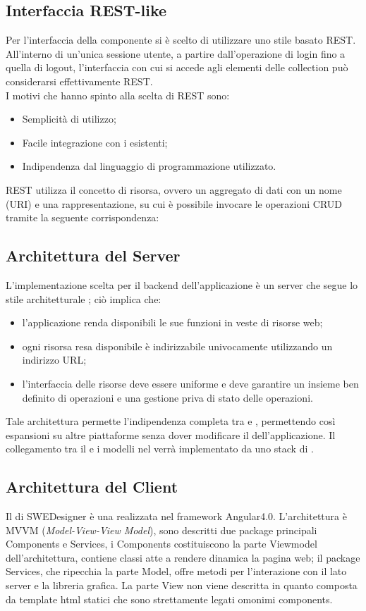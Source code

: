 	\subsection{Interfaccia REST-like}
	\label{3.3}
	Per l'interfaccia della componente  si è scelto di utilizzare uno stile basato REST. All'interno di un’unica sessione utente, a partire dall’operazione di login fino a quella di logout, l'interfaccia con cui si accede agli elementi delle collection può considerarsi effettivamente REST.\\
I motivi che hanno spinto alla scelta di REST sono:
\begin{itemize}
\item Semplicità di utilizzo;
\item Facile integrazione con i  esistenti;
\item Indipendenza dal linguaggio di programmazione utilizzato.
\end{itemize}
REST utilizza il concetto di risorsa, ovvero un aggregato di dati con un nome (URI) e una rappresentazione, su cui è possibile invocare le operazioni CRUD tramite la seguente corrispondenza:
	\subsection{Architettura del Server}
	\label{3.4}
	L'implementazione scelta per il backend dell'applicazione è un server che segue lo stile architetturale ; ciò implica che:
	\begin{itemize}
	\item l'applicazione renda disponibili le sue funzioni in veste di risorse web;
	\item ogni risorsa resa disponibile è indirizzabile univocamente utilizzando un indirizzo URL;
	\item l'interfaccia delle risorse deve essere uniforme e deve garantire un insieme ben definito di operazioni e una gestione priva di stato delle operazioni.
	\end{itemize}

Tale architettura permette l'indipendenza completa tra  e , permettendo così espansioni su altre piattaforme senza dover modificare il  dell'applicazione.
Il collegamento tra il  e i modelli nel  verrà implementato da uno stack di .
	\subsection{Architettura del Client}
	\label{3.5}
	Il  di SWEDesigner è una 
	realizzata nel framework Angular4.0. L'architettura è MVVM (\emph{Model-View-View Model}),
	sono descritti due package principali Components e Services, i Components costituiscono
	la parte Viewmodel dell'architettura, contiene classi atte a rendere dinamica la pagina web;
	il package Services, che ripecchia la parte Model, offre metodi per l'interazione con il
	lato server e la libreria grafica. La parte View non viene descritta in quanto composta da
	 template html statici che sono strettamente legati	omonimi components.
